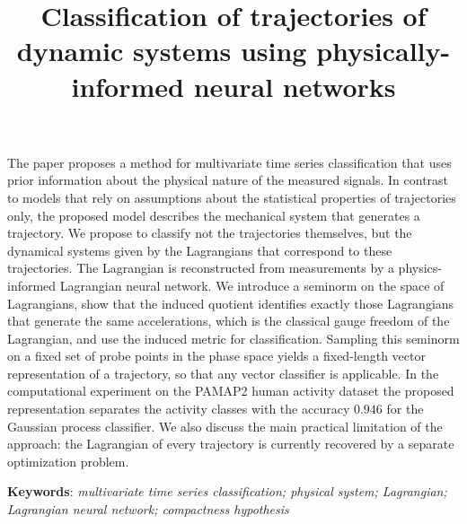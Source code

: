 \documentclass[sn-mathphys-num]{sn-jnl}
\theoremstyle{thmstylethree}
\theoremstyle{thmstyletwo}
\theoremstyle{thmstyleone}
\begin{document}

\title
	[Classification of trajectories of dynamic systems using
physically-informed neural networks] %
    {Classification of trajectories of dynamic systems using
physically-informed neural networks} %
\author*[1]{ }
\author[1]{ }


\abstract
{The paper proposes a method for multivariate time series classification that uses prior information about the physical nature of the measured signals. In contrast to models that rely on assumptions about the statistical properties of trajectories only, the proposed model describes the mechanical system that generates a trajectory. We propose to classify not the trajectories themselves, but the dynamical systems given by the Lagrangians that correspond to these trajectories. The Lagrangian is reconstructed from measurements by a physics-informed Lagrangian neural network. We introduce a seminorm on the space of Lagrangians, show that the induced quotient identifies exactly those Lagrangians that generate the same accelerations, which is the classical gauge freedom of the Lagrangian, and use the induced metric for classification. Sampling this seminorm on a fixed set of probe points in the phase space yields a fixed-length vector representation of a trajectory, so that any vector classifier is applicable. In the computational experiment on the PAMAP2 human activity dataset the proposed representation separates the activity classes with the accuracy $0.946$ for the Gaussian process classifier. We also discuss the main practical limitation of the approach: the Lagrangian of every trajectory is currently recovered by a separate optimization problem.

\textbf{Keywords}: \emph{multivariate time series classification; physical system; Lagrangian; Lagrangian neural network; compactness hypothesis}}


\maketitle
\end{document}

